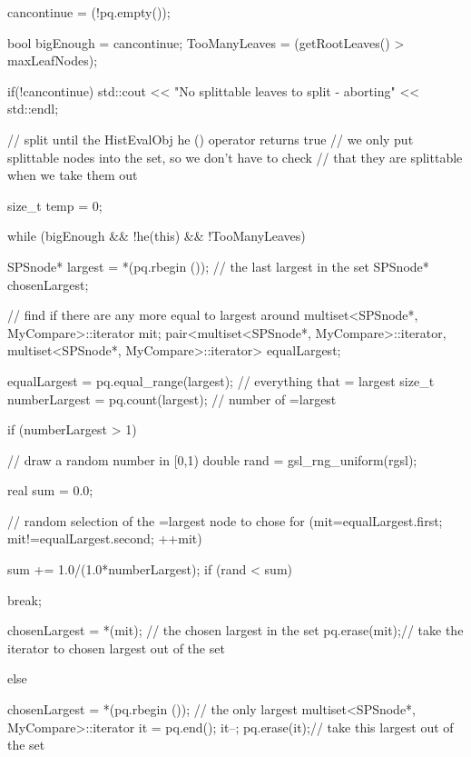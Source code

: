 \begin{DoxyCode}
{{        cancontinue = (!pq.empty());
      
        bool bigEnough = cancontinue;
       TooManyLeaves = (getRootLeaves() > maxLeafNodes);

        if(!cancontinue) {
            std::cout << "No splittable leaves to split - aborting" << 
      std::endl;
        }

      
        // split until the HistEvalObj he () operator returns true
        // we only put splittable nodes into the set, so we don't have to check
        // that they are splittable when we take them out
        
        size_t temp = 0;
        
        while (bigEnough && !he(this) && !TooManyLeaves) {
            
            SPSnode* largest = *(pq.rbegin ()); // the last largest in the set
            SPSnode* chosenLargest;
            
            // find if there are any more equal to largest around
            multiset<SPSnode*, MyCompare>::iterator mit;
            pair<multiset<SPSnode*, MyCompare>::iterator,
                multiset<SPSnode*, MyCompare>::iterator> equalLargest;

            equalLargest = pq.equal_range(largest); // everything that =
       largest
            size_t numberLargest = pq.count(largest); // number of =largest

            if (numberLargest > 1) {

                // draw a random number in [0,1)
                double rand = gsl_rng_uniform(rgsl);

                real sum = 0.0;

                // random selection of the =largest node to chose
                for (mit=equalLargest.first; mit!=equalLargest.second; ++mit) {

                    sum += 1.0/(1.0*numberLargest);
                    if (rand < sum) {

                        break;
                    }
                }
                chosenLargest = *(mit); // the chosen largest in the set
                pq.erase(mit);// take the iterator to chosen largest out of the
       set
            }

            else {

                chosenLargest = *(pq.rbegin ()); // the only largest
                multiset<SPSnode*, MyCompare>::iterator it = pq.end();
                it--;
                pq.erase(it);// take this largest out of the set
            }

}}}
\end{DoxyCode}
